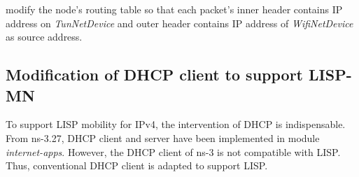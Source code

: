 modify the node's routing table so that each packet's inner header contains IP address on \emph{TunNetDevice} and outer header contains IP address of \emph{WifiNetDevice} as source address.

\subsection{Modification of DHCP client to support LISP-MN}
\label{subsec:DHCP}
To support LISP mobility for IPv4, the intervention of DHCP is indispensable. From ns-3.27, DHCP client and server have been implemented in module \emph{internet-apps}. However, the DHCP client of ns-3 is not compatible with LISP. Thus, conventional DHCP client is adapted to support LISP.

